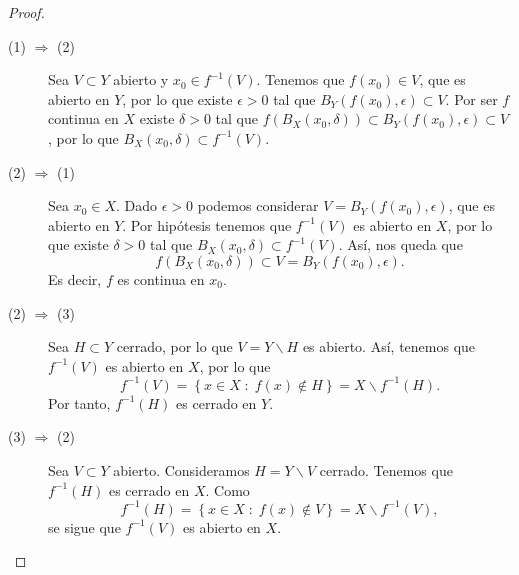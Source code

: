 \begin{proof}
\begin{description}
\item[(1) $\displaystyle \Rightarrow $ (2)] Sea $\displaystyle V \subset Y$ abierto y $\displaystyle x_{0} \in f^{-1}\left(V\right) $. Tenemos que $\displaystyle f\left(x_{0}\right) \in V $, que es abierto en $\displaystyle Y $, por lo que existe $\displaystyle \epsilon > 0 $ tal que $\displaystyle B _{Y}\left(f\left(x_{0}\right), \epsilon \right) \subset V $. 
Por ser $\displaystyle f $ continua en $\displaystyle X $ existe $\displaystyle \delta > 0 $ tal que $\displaystyle f\left(B _{X}\left(x_{0}, \delta \right)\right) \subset B_{Y}\left(f\left(x_{0}\right), \epsilon \right) \subset V $, por lo que $\displaystyle B_{X}\left(x_{0}, \delta \right)\subset f^{-1}\left(V\right) $.
\item[(2) $\displaystyle \Rightarrow $ (1)] Sea $\displaystyle x_{0} \in X $. Dado $\displaystyle \epsilon > 0 $ podemos considerar $\displaystyle V =  B_{Y}\left(f\left(x_{0}\right), \epsilon \right)$, que es abierto en $\displaystyle Y $. Por hipótesis tenemos que $\displaystyle f^{-1}\left(V\right) $ es abierto en $\displaystyle X $, por lo que existe $\displaystyle \delta > 0 $ tal que $\displaystyle B_{X}\left(x_{0}, \delta \right) \subset f^{-1}\left(V\right) $. Así, nos queda que 
	\[f\left(B_{X}\left(x_{0}, \delta \right)\right) \subset V = B_{Y}\left(f\left(x_{0}\right), \epsilon \right) .\]
	Es decir, $\displaystyle f $ es continua en $\displaystyle x_{0} $. 
\item[(2) $\displaystyle  \Rightarrow $ (3)] Sea $\displaystyle H \subset Y $ cerrado, por lo que $\displaystyle V = Y \backslash H $ es abierto. Así, tenemos que $\displaystyle f^{-1}\left(V\right) $ es abierto en $\displaystyle X $, por lo que
	\[f^{-1}\left(V\right) = \left\{ x \in X \; : \; f\left(x\right) \not\in H\right\} = X \backslash f^{-1}\left(H\right) .\]
	Por tanto, $\displaystyle f^{-1}\left(H\right) $ es cerrado en $\displaystyle Y $.
\item[(3) $\displaystyle  \Rightarrow $ (2)] Sea $\displaystyle V \subset Y $ abierto. Consideramos $\displaystyle H = Y \backslash V $ cerrado. Tenemos que $\displaystyle f^{-1}\left(H\right) $ es cerrado en $\displaystyle X $. Como  
	\[f^{-1}\left(H\right) = \left\{ x \in X \; : \; f\left(x\right) \not\in V\right\}  = X \backslash f^{-1}\left(V\right) ,\]
	se sigue que $\displaystyle f^{-1}\left(V\right) $ es abierto en $\displaystyle X $.
\end{description}
\end{proof}
